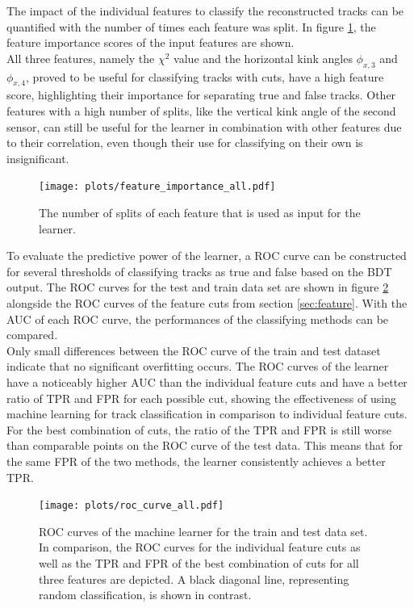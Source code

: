 The impact of the individual features to classify the reconstructed tracks can be quantified with the number of times each feature was split.
In figure \ref{fig:importance}, the feature importance scores of the input features are shown. \\
All three features, namely the $\chi^2$ value and the horizontal kink angles  $\phi_{x,3}$ and $\phi_{x,4}$,
proved to be useful for classifying tracks with cuts, have a high feature score, highlighting their importance for separating true and false tracks.
Other features with a high number of splits, like the vertical kink angle of the second sensor,
can still be useful for the learner in combination with other features due to their
correlation, even though their use for classifying on their own is insignificant.
\begin{figure}
  \centering
  \texttt{[image: plots/feature\_importance\_all.pdf]}
  \caption{The number of splits of each feature that is used as input for the learner.}
  \label{fig:importance}
\end{figure}

To evaluate the predictive power of the learner, a ROC curve can be constructed for several thresholds of classifying tracks as true and false based on the BDT
output. The ROC curves for the test and train data set are shown in figure \ref{fig:auc_comparison} alongside the ROC curves of the feature cuts from section \ref{sec:feature}.
With the AUC of each ROC curve, the performances of the classifying methods can be compared. \\%
Only small differences between the ROC curve of the train and test dataset indicate that no significant overfitting occurs.
The ROC curves of the learner have a noticeably higher AUC than the individual feature cuts and have a better ratio of
TPR and FPR for each possible cut, showing the effectiveness
of using machine learning for track classification in comparison to individual feature cuts. For the best combination of cuts, the ratio of the TPR and FPR is still worse than
comparable points on the ROC curve of the test data. This means that for the same FPR of the two methods, the learner consistently achieves a better TPR.

\begin{figure}[H]
  \centering
  \texttt{[image: plots/roc\_curve\_all.pdf]}
    \caption{ROC curves of the machine learner for the train and test data set. In comparison, the ROC curves for the individual feature cuts as well as the
    TPR and FPR of the best combination of cuts for all three features are depicted. A black diagonal line, representing random classification, is shown
    in contrast.}
  \label{fig:auc_comparison}
\end{figure}

